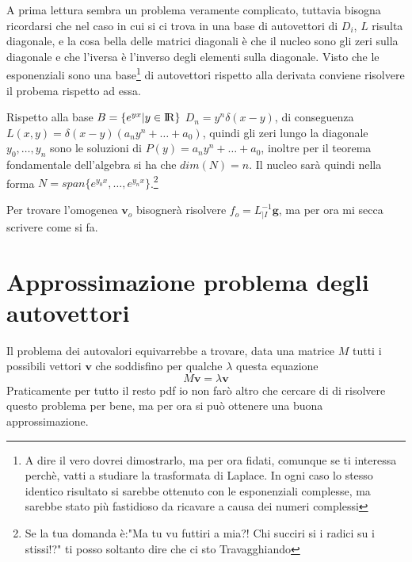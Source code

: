 \documentclass[11pt,a4paper]{report}
\newcommand{\vettore}[1]{\mathbf{#1}}
\theoremstyle{definition}
\theoremstyle{plain}
\theoremstyle{plain}
\begin{document}
			A prima lettura sembra un problema veramente complicato, tuttavia bisogna ricordarsi che nel caso in cui si ci trova in una base di autovettori di $D_i$, $L$ risulta diagonale, e la cosa bella delle matrici diagonali è che il nucleo sono gli zeri sulla diagonale e che l'iversa è l'inverso degli elementi sulla diagonale.\newline
			Visto che le esponenziali sono una base\footnote{A dire il vero dovrei dimostrarlo, ma per ora fidati, comunque se ti interessa perchè, vatti a studiare la trasformata di Laplace. In ogni caso lo stesso identico risultato si sarebbe ottenuto con le esponenziali complesse, ma sarebbe stato più fastidioso da ricavare a causa dei numeri complessi} di autovettori rispetto alla derivata conviene risolvere il probema rispetto ad essa.\newline

			Rispetto alla base $B=\{e^{yx}|y \in \rm I\!R\}$ $D_n=y^n\delta(x-y)$, di conseguenza $L(x,y)=\delta(x-y)(a_ny^n+\dots+a_0)$, quindi gli zeri lungo la diagonale $y_0,\dots,y_n$ sono le soluzioni di $P(y)=a_ny^n+\dots+a_0$, inoltre per il teorema fondamentale dell'algebra si ha che $dim(N)=n$. Il nucleo sarà quindi nella forma $N=span\{e^{y_0x},\dots,e^{y_nx}\}$.\footnote{Se la tua domanda è:"Ma tu vu futtiri a mia?! Chi succiri si i radici su i stissi!?" ti posso soltanto dire che ci sto Travagghiando}\newline

			Per trovare l'omogenea $\vettore v_o$ bisognerà risolvere $f_o=L^{-1}_{|I}\vettore g$, ma per ora mi secca scrivere come si fa.



		\section{Approssimazione problema degli autovettori}
			Il problema dei autovalori equivarrebbe a trovare, data una matrice $M$ tutti i possibili vettori $\vettore v$ che soddisfino per qualche $\lambda$ questa equazione
			\begin{equation}
				M\vettore v=\lambda \vettore v
				\label{eq:autovett1}
			\end{equation}
			Praticamente per tutto il resto pdf io non farò altro che cercare di di risolvere questo problema per bene, ma per ora si può ottenere una buona approssimazione.\newline
\end{document}
